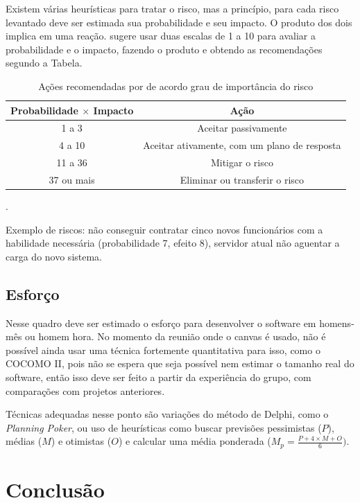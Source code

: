 \documentclass{article}
\begin{document}
Existem várias heurísticas para tratar o risco, mas a princípio, para cada risco levantado deve ser estimada sua probabilidade e seu impacto. O produto dos dois implica em uma reação. \citet{finocchio:2013} sugere usar duas escalas de 1 a 10 para avaliar a probabilidade e o impacto, fazendo o produto e obtendo as recomendações segundo a Tabela.

\begin{table}[hbt]
    \centering
    \begin{tabular}{cc}
    \toprule
     Probabilidade $\times$ Impacto    &  Ação  \\
     \midrule
         1 a 3  & Aceitar passivamente \\
         4 a 10 & Aceitar ativamente, com um plano de resposta \\
         11 a 36 & Mitigar o risco \\
         37 ou mais & Eliminar ou transferir o risco \\
    \bottomrule
    \end{tabular}
    \caption{Ações recomendadas por \citep{finocchio:2013} de acordo grau de importância do risco}.
    \label{tab:risco}
\end{table}

Exemplo de riscos: não conseguir contratar cinco novos funcionários com a habilidade necessária (probabilidade 7, efeito 8), servidor atual não aguentar a carga do novo sistema.

\subsection{Esforço}

Nesse quadro deve ser estimado o esforço para desenvolver o software em homens-mês ou homem hora. No momento da reunião onde o canvas é usado, não é possível ainda usar uma técnica fortemente quantitativa para isso, como o COCOMO II\citep{Boehm:cocomo2}, pois não se espera que seja possível nem estimar o tamanho real do software, então isso deve ser feito a partir da experiência do grupo, com comparações com projetos anteriores. 

Técnicas adequadas nesse ponto são variações do método de Delphi\citep{delphi:1966}, como o \textit{Planning Poker}\citep{mike:agile:estimating}, ou uso de heurísticas como buscar previsões pessimistas ($P$), médias ($M$) e otimistas ($O$) e calcular uma média ponderada ($M_p=\frac{P+4\times M+O}{6})$\citep{pmbok:6}.

\section{Conclusão}
\end{document}
